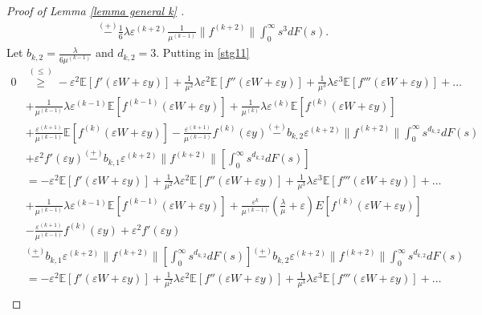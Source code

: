 \documentclass[11pt,letterpaper,reqno]{article}
\theoremstyle{thmstyleone}%
\theoremstyle{thmstyletwo}%
\theoremstyle{thmstylethree}%
\numberwithin{equation}{section}
\begin{document}
\begin{proof}[Proof of Lemma \ref{lemma general k} ]
\begin{align}
    &\stackrel{(+)}{-}\frac{1}{6} \lambda \varepsilon^{(k+2)} \frac{1}{\mu^{(k-1)}} \|f^{(k+2)}\|\int_0^\infty s^3 dF(s).
\end{align}
Let $b_{k,2}=\frac{\lambda}{6\mu^{(k-1)}}$ and $d_{k,2}=3$. Putting in \eqref{stg11}
\begin{align}\label{stg13}
 \nonumber   0 &\stackrel{(\leq)} {\geq} -\varepsilon^2\mathbb E[f'(\varepsilon W+\varepsilon y)]+\frac{1}{\mu^2}\lambda \varepsilon^2 \mathbb E[f''(\varepsilon W+\varepsilon y)]+\frac{1}{\mu^3}\lambda \varepsilon^3 \mathbb E[f'''(\varepsilon W+\varepsilon y)]+ \ldots\\
 \nonumber &+\frac{1}{\mu^{(k-1)}}\lambda \varepsilon^{(k-1)}\mathbb E[f^{(k-1)}(\varepsilon W+\varepsilon y)]+\frac{1}{\mu^{(k)}}\lambda \varepsilon^{(k)}\mathbb E[f^{(k)}(\varepsilon W+\varepsilon y)]\\
 \nonumber    &+\frac{\varepsilon^{(k+1)}}{\mu^{(k-1)}}\mathbb E[f^{(k)}(\varepsilon W+\varepsilon y)]-\frac{\varepsilon^{(k+1)}}{\mu^{(k-1)}}f^{(k)}(\varepsilon y)\stackrel{(+)}{-}b_{k,2}\varepsilon^{(k+2)} \|f^{(k+2)}\|\int_0^\infty s^{d_{k,2}}dF(s)\\
 \nonumber      &+\varepsilon^2 f'(\varepsilon y)\stackrel{(+)}{-}b_{k,1} \varepsilon^{(k+2)} \|f^{(k+2)}\| \left[\int_0^\infty s^{d_{k,2}} dF(s)\right]\\
  \nonumber     &=-\varepsilon^2\mathbb E[f'(\varepsilon W+\varepsilon y)]+\frac{1}{\mu^2}\lambda \varepsilon^2 \mathbb E[f''(\varepsilon W+\varepsilon y)]+\frac{1}{\mu^3}\lambda \varepsilon^3 \mathbb E[f'''(\varepsilon W+\varepsilon y)]+ \ldots\\
        \nonumber &+\frac{1}{\mu^{(k-1)}}\lambda \varepsilon^{(k-1)}\mathbb E[f^{(k-1)}(\varepsilon W+\varepsilon y)]+\frac{\varepsilon^k}{\mu^{(k-1)}}\left(\frac{\lambda}{\mu}+\varepsilon \right)E[f^{(k)}(\varepsilon W+\varepsilon y)]\\
   \nonumber     &-\frac{\varepsilon^{(k+1)}}{\mu^{(k-1)}}f^{(k)}(\varepsilon y)+\varepsilon^2 f'(\varepsilon y)\\
\nonumber        &\stackrel{(+)}{-}b_{k,1} \varepsilon^{(k+2)} \|f^{(k+2)}\| \left[\int_0^\infty s^{d_{k,2}} dF(s)\right]\stackrel{(+)}{-}b_{k,2}\varepsilon^{(k+2)} \|f^{(k+2)}\|\int_0^\infty s^{d_{k,2}} dF(s)\\
 \nonumber     &=-\varepsilon^2\mathbb E[f'(\varepsilon W+\varepsilon y)]+\frac{1}{\mu^2}\lambda \varepsilon^2 \mathbb E[f''(\varepsilon W+\varepsilon y)]+\frac{1}{\mu^3}\lambda \varepsilon^3 \mathbb E[f'''(\varepsilon W+\varepsilon y)]+ \ldots\\

\end{align}
\end{proof}
\end{document}
